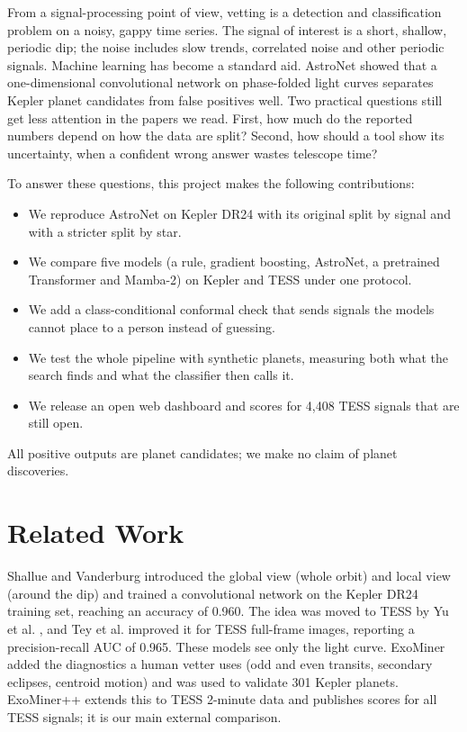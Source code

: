 \documentclass[conference,a4paper]{IEEEtran}
\begin{document}
From a signal-processing point of view, vetting is a detection and classification problem on a noisy, gappy time series. The signal of interest is a short, shallow, periodic dip; the noise includes slow trends, correlated noise and other periodic signals. Machine learning has become a standard aid. AstroNet \cite{r3} showed that a one-dimensional convolutional network on phase-folded light curves separates Kepler planet candidates from false positives well. Two practical questions still get less attention in the papers we read. First, how much do the reported numbers depend on how the data are split? Second, how should a tool show its uncertainty, when a confident wrong answer wastes telescope time?

To answer these questions, this project makes the following contributions:

\begin{itemize}
\item We reproduce AstroNet on Kepler DR24 with its original split by signal and with a stricter split by star.
\item We compare five models (a rule, gradient boosting, AstroNet, a pretrained Transformer and Mamba-2) on Kepler and TESS under one protocol.
\item We add a class-conditional conformal check that sends signals the models cannot place to a person instead of guessing.
\item We test the whole pipeline with synthetic planets, measuring both what the search finds and what the classifier then calls it.
\item We release an open web dashboard and scores for 4,408 TESS signals that are still open.
\end{itemize}
All positive outputs are planet candidates; we make no claim of planet discoveries.

\section{Related Work}
Shallue and Vanderburg \cite{r3} introduced the global view (whole orbit) and local view (around the dip) and trained a convolutional network on the Kepler DR24 training set, reaching an accuracy of 0.960. The idea was moved to TESS by Yu et al. \cite{r4}, and Tey et al. \cite{r5} improved it for TESS full-frame images, reporting a precision-recall AUC of 0.965. These models see only the light curve. ExoMiner \cite{r6} added the diagnostics a human vetter uses (odd and even transits, secondary eclipses, centroid motion) and was used to validate 301 Kepler planets. ExoMiner++ \cite{r7} extends this to TESS 2-minute data and publishes scores for all TESS signals; it is our main external comparison.
\end{document}
